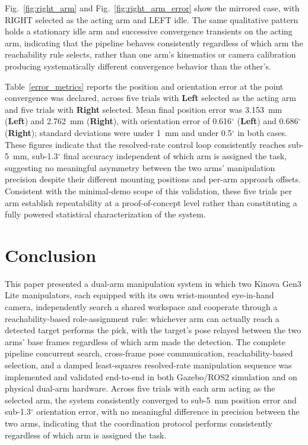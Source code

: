 \documentclass[letterpaper, 10 pt, conference]{ieeeconf}  %
\begin{document}
Fig.~\ref{fig:right_arm} and Fig.~\ref{fig:right_arm_error} show the mirrored case, with RIGHT selected as the acting arm and
LEFT idle. The same qualitative pattern holds a stationary idle arm and successive convergence transients on the acting arm, indicating that the pipeline behaves consistently regardless of which arm the reachability rule selects, rather than one arm's kinematics or camera calibration producing systematically different convergence behavior than the other's.

Table~\ref{error_metrics} reports the position and orientation error at the point convergence was declared, across five trials with \textbf{Left} selected as the acting arm and five trials with \textbf{Right} selected. Mean final position error was 3.153~mm (\textbf{Left}) and 2.762~mm (\textbf{Right}), with orientation error of 0.616$^\circ$ (\textbf{Left}) and 0.686$^\circ$ (\textbf{Right}); standard deviations were under 1~mm and under 0.5$^\circ$ in both cases. These figures indicate that the resolved-rate control loop consistently reaches sub-5~mm, sub-1.3$^\circ$ final accuracy independent of which arm is assigned the task, suggesting no meaningful asymmetry between the two arms' manipulation precision despite their different mounting positions and per-arm approach offsets. Consistent with the minimal-demo scope of this validation, these five trials per arm establish repeatability at a proof-of-concept level rather than constituting a fully powered statistical characterization of the system.
\section{Conclusion}
This paper presented a dual-arm manipulation system in which two Kinova Gen3 Lite manipulators, each equipped with its own wrist-mounted eye-in-hand camera, independently search a shared workspace and cooperate through a reachability-based role-assignment rule: whichever arm can actually reach a detected target performs the pick, with the target's pose relayed between the two arms' base frames regardless of which arm made
the detection. The complete pipeline concurrent search, cross-frame pose communication, reachability-based selection, and a damped least-squares resolved-rate manipulation sequence was implemented and validated end-to-end in both Gazebo/ROS2
simulation and on physical dual-arm hardware. Across five trials with each arm acting as the selected arm, the system consistently converged to sub-5~mm position error and sub-1.3$^\circ$ orientation error, with no meaningful difference in precision between the two arms, indicating that the coordination protocol performs consistently regardless of which arm is assigned the task. 
\end{document}
